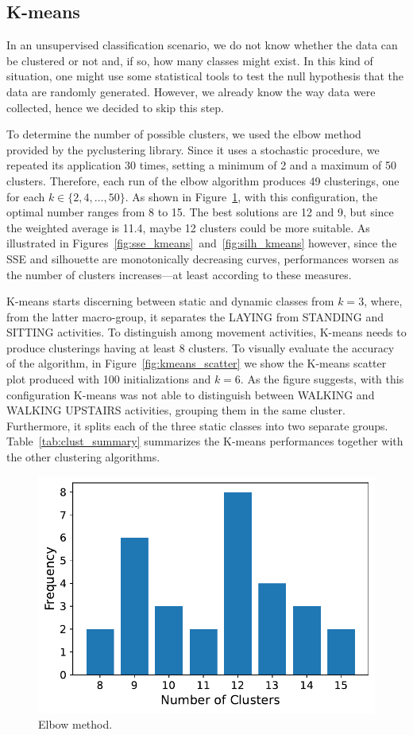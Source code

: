 \documentclass[10pt, a4paper, twocolumn]{article}
\begin{document}
\subsection*{K-means}

In an unsupervised classification scenario, we do not know whether the data can be clustered or not and, if so, how many classes might exist. In this kind of situation, one might use some statistical tools to test the null hypothesis that the data are randomly generated. However, we already know the way data were collected, hence we decided to skip this step.

To determine the number of possible clusters, we used the elbow method provided by the pyclustering library. Since it uses a stochastic procedure, we repeated its application 30 times, setting a minimum of 2 and a maximum of 50 clusters. Therefore, each run of the elbow algorithm produces 49 clusterings, one for each $k \in \{2,4,\dots,50\}$. As shown in Figure~\ref{fig:elbow}, with this configuration, the optimal number ranges from 8 to 15. The best solutions are 12 and 9, but since the weighted average is 11.4, maybe 12 clusters could be more suitable. As illustrated in Figures~\ref{fig:sse_kmeans}~and~\ref{fig:silh_kmeans} however, since the SSE and silhouette are monotonically decreasing curves, performances worsen as the number of clusters increases---at least according to these measures.

K-means starts discerning between static and dynamic classes from $k=3$, where, from the latter macro-group, it separates the LAYING from STANDING and SITTING activities. To distinguish among movement activities, K-means needs to produce clusterings having at least 8 clusters. To visually evaluate the accuracy of the algorithm, in Figure~\ref{fig:kmeans_scatter} we show the K-means scatter plot produced with 100 initializations and $k=6$. As the figure suggests, with this configuration K-means was not able to distinguish between WALKING and WALKING UPSTAIRS activities, grouping them in the same cluster. Furthermore, it splits each of the three static classes into two separate groups. Table~\ref{tab:clust_summary} summarizes the K-means performances together with the other clustering algorithms.

\begin{figure}[h]
\centering
    \includegraphics[width=0.65\linewidth]{immagini simone/elbow_kmeans.pdf}
    \caption{Elbow method.}
    \label{fig:elbow}
\end{figure}
\end{document}
